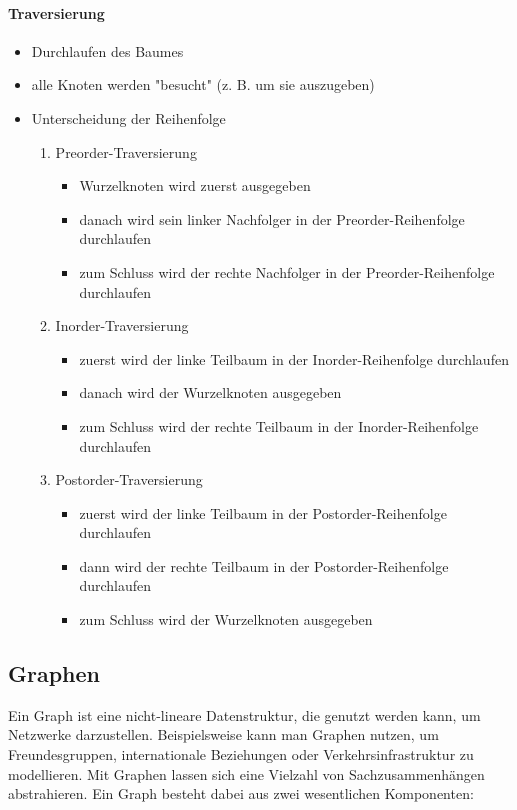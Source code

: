 \documentclass{article}
\begin{document}
	\paragraph{Traversierung}
	
	\begin{itemize}
		\item Durchlaufen des Baumes
		\item alle Knoten werden "besucht" (z. B. um sie auszugeben)
		\item Unterscheidung der Reihenfolge
		\begin{enumerate}
			\item Preorder-Traversierung
			\begin{itemize}
				\item Wurzelknoten wird zuerst ausgegeben
				\item danach wird sein linker Nachfolger in der Preorder-Reihenfolge durchlaufen
				\item zum Schluss wird der rechte Nachfolger in der Preorder-Reihenfolge durchlaufen
			\end{itemize}
			\item Inorder-Traversierung
			\begin{itemize}
				\item zuerst wird der linke Teilbaum in der Inorder-Reihenfolge durchlaufen
				\item danach wird der Wurzelknoten ausgegeben
				\item zum Schluss wird der rechte Teilbaum in der Inorder-Reihenfolge durchlaufen
			\end{itemize}
			\item Postorder-Traversierung
			\begin{itemize}
				\item zuerst wird der linke Teilbaum in der Postorder-Reihenfolge durchlaufen
				\item dann wird der rechte Teilbaum in der Postorder-Reihenfolge durchlaufen
				\item zum Schluss wird der Wurzelknoten ausgegeben
			\end{itemize}
		\end{enumerate}
	\end{itemize}

	\subsection{Graphen}
	Ein Graph ist eine nicht-lineare Datenstruktur, die genutzt werden kann, um Netzwerke darzustellen. Beispielsweise kann man Graphen nutzen, um Freundesgruppen, internationale Beziehungen oder Verkehrsinfrastruktur zu modellieren. Mit Graphen lassen sich eine Vielzahl von Sachzusammenhängen abstrahieren.
	Ein Graph besteht dabei aus zwei wesentlichen Komponenten:
\end{document}
